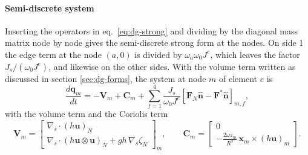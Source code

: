 \paragraph{Semi-discrete system}
Inserting the operators in eq.~\eqref{eq:dg-strong} and dividing by the diagonal mass matrix node by node gives the semi-discrete strong form at the nodes. On side 1 the edge term at the node $(a,0)$ is divided by $\omega_a\omega_0J^e$, which leaves the factor $J_s/(\omega_0J^e)$, and likewise on the other sides. With the volume term written as discussed in section \ref{sec:dg-forms}, the system at node $m$ of element $e$ is
\begin{equation}\label{eq:dg-semistrong}
    \frac{d\mathbf{q}_m}{dt} = -\mathbf{V}_m + \mathbf{C}_m + \sum_{f=1}^{4}\frac{J_s}{\omega_0J^e}\left[\mathbf{F}_N\hat{\mathbf{n}} - \mathbf{F}^*\hat{\mathbf{n}}\right]_{m,f},
\end{equation}
with the volume term and the Coriolis term
\begin{equation}\label{eq:dg-volume}
    \mathbf{V}_m =
    \begin{bmatrix}
    \nabla_s\cdot(h\mathbf{u})_N\\
    \nabla_s\cdot(h\mathbf{u}\otimes\mathbf{u})_N + g h\,\nabla_s\zeta_N
    \end{bmatrix}_m, \qquad
    \mathbf{C}_m =
    \begin{bmatrix}
    0\\
    -\frac{2\omega z_m}{R^2}\,\mathbf{x}_m\times(h\mathbf{u})_m
    \end{bmatrix}.
\end{equation}

